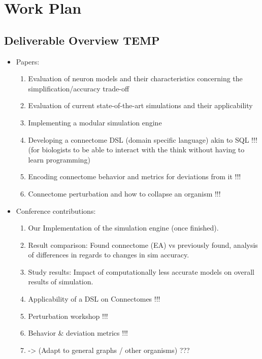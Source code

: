 \documentclass[a4paper,11pt]{article}
\begin{document}
%

\section{Work Plan}

\subsection{Deliverable Overview TEMP}
\begin{itemize}
\item Papers:
\begin{enumerate}
\item Evaluation of neuron models and their characteristics concerning the simplification/accuracy trade-off
\item Evaluation of current state-of-the-art simulations and their applicability
\item Implementing a modular simulation engine
\item Developing a connectome DSL (domain specific language) akin to SQL !!! (for biologists to be able to interact with the think without having to learn programming)
\item Encoding connectome behavior and metrics for deviations from it !!!
\item Connectome perturbation and how to collapse an organism !!!

\end{enumerate}
\item Conference contributions:
\begin{enumerate}
\item Our Implementation of  the simulation engine (once finished). 
\item Result comparison: Found connectome (EA) vs previously found, analysis of differences in regards to changes in sim accuracy. 
\item Study results: Impact of computationally less accurate models on overall results of simulation.
\item Applicability of a DSL on Connectomes !!!
\item Perturbation workshop !!!
\item Behavior \& deviation metrics !!! 
\item -> (Adapt to general graphs / other organisms) ???
\end{enumerate}
\end{itemize}
\end{document}
